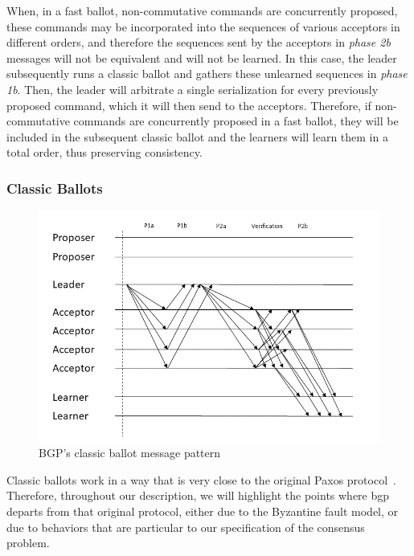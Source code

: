  When, in a fast ballot, non-commutative commands are  concurrently proposed, these commands may be incorporated into the sequences of various acceptors in different orders, and therefore the sequences sent by the acceptors in \textit{phase 2b} messages will not be equivalent and will not be learned. In this case, the leader subsequently runs a classic ballot and gathers these unlearned sequences in \textit{phase 1b}. Then, the leader will arbitrate a single serialization for every previously proposed command, which it will then send to the acceptors. Therefore, if non-commutative commands are concurrently proposed in a fast ballot, they will be included in the subsequent classic ballot and the learners will learn them in a total order, thus preserving consistency.

\subsubsection{Classic Ballots} 

\begin{figure}
	\centering
	\includegraphics[width=\textwidth*2/3]{Figures/bgp_classic}
	\caption{BGP's classic ballot message pattern}
	\label{bgp_classic}
\end{figure}
Classic ballots work in a way that is very close to the original Paxos protocol~\cite{Lamport:1998}. Therefore, throughout our description, we will highlight the points where \acrshort{bgp} departs from that original protocol, either due to the Byzantine fault model, or due to behaviors that are particular to our specification of the consensus problem.\par

